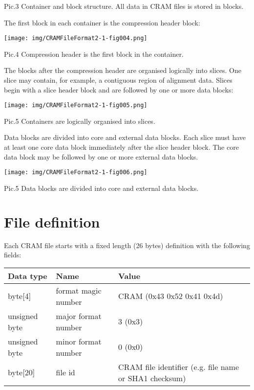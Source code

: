 \documentclass[a4paper]{article}
\begin{document}
Pic.3 Container and block structure. All data in CRAM files is stored in blocks.

The first block in each container is the compression header block:

\texttt{[image: img/CRAMFileFormat2-1-fig004.png]}

Pic.4 Compression header is the first block in the container.

The blocks after the compression header are organised logically into slices. One 
slice may contain, for example, a contiguous region of alignment data. Slices begin 
with a slice header block and are followed by one or more data blocks:

\texttt{[image: img/CRAMFileFormat2-1-fig005.png]}

Pic.5 Containers are logically organised into slices.

Data blocks are divided into core and external data blocks. Each slice must have 
at least one core data block immediately after the slice header block. The core 
data block may be followed by one or more external data blocks.

\texttt{[image: img/CRAMFileFormat2-1-fig006.png]}

Pic.5 Data blocks are divided into core and external data blocks. 

\section{\textbf{File definition}}

Each CRAM file starts with a fixed length (26 bytes) definition with the following 
fields:

\begin{tabular}{|l|l|l|}
\hline
\textbf{Data type} & \textbf{Name} & \textbf{Value}\tabularnewline
\hline
byte[4] & format magic number & CRAM (0x43 0x52 0x41 0x4d)\tabularnewline
\hline
unsigned byte & major format number & 3 (0x3)\tabularnewline
\hline
unsigned byte & minor format number & 0 (0x0)\tabularnewline
\hline
byte[20] & file id & CRAM file identifier (e.g. file name or SHA1 checksum)\tabularnewline
\hline
\end{tabular}
\end{document}
